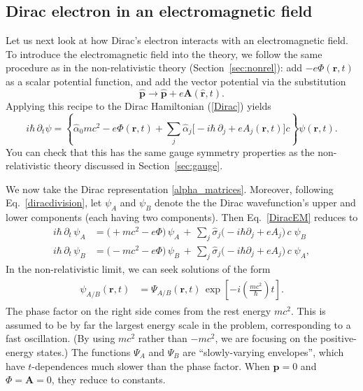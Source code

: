 \documentclass[prx,12pt]{revtex4-2}
\begin{document}
\subsection{Dirac electron in an electromagnetic field}
\label{sec:diracem}

Let us next look at how Dirac's electron interacts with an
electromagnetic field.  To introduce the electromagnetic field into
the theory, we follow the same procedure as in the non-relativistic
theory (Section~\ref{sec:nonrel}): add $-e\Phi(\mathbf{r},t)$ as a
scalar potential function, and add the vector potential via the
substitution
\begin{equation}
  \hat{\mathbf{p}} \rightarrow \hat{\mathbf{p}}
  + e\mathbf{A}(\hat{\mathbf{r}},t).  
\end{equation}
Applying this recipe to the Dirac Hamiltonian (\ref{Dirac}) yields
\begin{equation}
  i\hbar \, \partial_t \psi
  = \left\{\hat{\alpha}_0 mc^2 -e\Phi(\mathbf{r},t)
  + \sum_{j} \hat{\alpha}_j \Big[-i\hbar\,\partial_j
    +eA_j(\mathbf{r},t) \Big] c\right\}\psi(\mathbf{r},t).
  \label{DiracEM}
\end{equation}
You can check that this has the same gauge symmetry properties as the
non-relativistic theory discussed in Section~\ref{sec:gauge}.

We now take the Dirac representation \eqref{alpha_matrices}.
Moreover, following Eq.~\eqref{diracdivision}, let $\psi_A$ and
$\psi_B$ denote the the Dirac wavefunction's upper and lower
components (each having two components).  Then Eq.~\eqref{DiracEM}
reduces to
\begin{align}
  i\hbar\, \partial_t \, \psi_A
  &= \big(+mc^2 -e\Phi \big)\,
  \psi_A
  \,+\, \sum_{j} \hat{\sigma}_j \big(-i\hbar\partial_j
    +eA_j \big) \,c\;\psi_B \label{Dirac2a} \\
  i\hbar\, \partial_t \, \psi_B
  &= \big(- mc^2 -e\Phi\big)\,
  \psi_B \,+\, \sum_{j} \hat{\sigma}_j \big(-i\hbar\partial_j
    +eA_j \big)\, c\;\psi_A, \label{Dirac2b}
\end{align}
In the non-relativistic limit, we can seek solutions of the form
\begin{align}
  \begin{aligned}
  \psi_{A/B}(\mathbf{r},t) &= \Psi_{A/B}(\mathbf{r},t)\,
  \exp\left[-i\left(\frac{mc^2}{\hbar}\right)t\right].
  \end{aligned}
\end{align}
The phase factor on the right side comes from the rest energy $mc^2$.
This is assumed to be by far the largest energy scale in the problem,
corresponding to a fast oscillation.  (By using $mc^2$ rather than
$-mc^2$, we are focusing on the positive-energy states.)  The
functions $\Psi_A$ and $\Psi_B$ are ``slowly-varying envelopes'',
which have $t$-dependences much slower than the phase factor.  When
$\mathbf{p} = 0$ and $\Phi = \mathbf{A} = 0$, they reduce to
constants.
\end{document}
